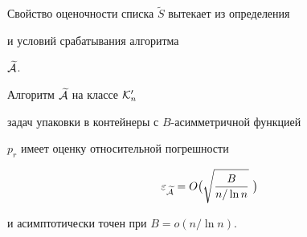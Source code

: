 Свойство оценочности  списка $\widetilde {S}$ вытекает из определения


 и условий  срабатывания алгоритма


$\widetilde{ \cal A}$.





\begin{thm}


\label{th2}


Алгоритм $\widetilde{ \cal A}$ на классе ${\cal K}_n'$


задач упаковки в контейнеры с $B$-асимметричной функцией


$p_{r}$ имеет оценку относительной погрешности


$$


\varepsilon_{\widetilde{ \cal A}}=


O\bigl( \sqrt {\frac {B}{n/\ln n}}\ \bigr)


$$


и асимптотически точен при $B=o(n/\ln n)$.


\end{thm}





